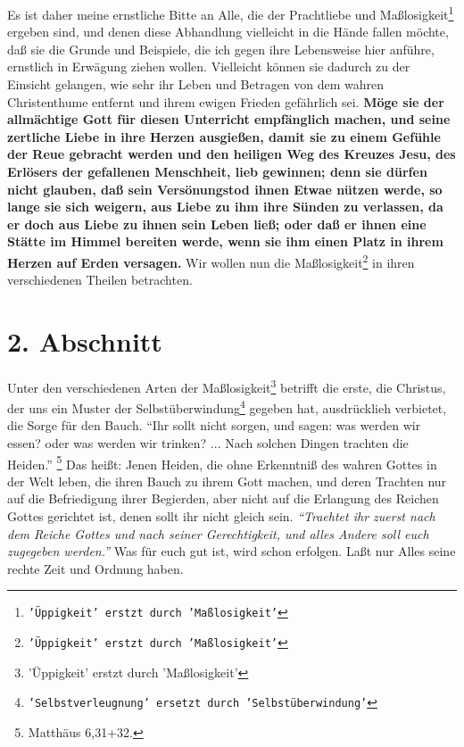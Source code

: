 Es ist daher meine
ernstliche Bitte an Alle, die der Prachtliebe und Maßlosigkeit\footnote{\texttt{'Üppigkeit' erstzt durch 'Maßlosigkeit'}} ergeben sind, und
denen diese Abhandlung vielleicht in die Hände fallen möchte, daß sie die Grunde
und Beispiele, die ich gegen ihre Lebensweise hier anführe, ernstlich in
Erwägung ziehen wollen. Vielleicht können sie dadurch zu der Einsicht gelangen,
wie sehr ihr Leben und Betragen von dem wahren Christenthume entfernt und ihrem
ewigen Frieden gefährlich sei. \textbf{Möge sie der allmächtige Gott für diesen
Unterricht empfänglich machen, und seine zertliche Liebe in ihre Herzen
ausgießen, damit sie zu einem Gefühle der Reue gebracht werden und den heiligen
Weg des Kreuzes Jesu, des Erlösers der gefallenen Menschheit, lieb gewinnen;
denn sie dürfen nicht glauben, daß sein Versönungstod ihnen Etwae nützen werde,
so lange sie sich weigern, aus Liebe zu ihm ihre Sünden zu verlassen, da er doch
aus Liebe zu ihnen sein Leben ließ; oder daß er ihnen eine Stätte im Himmel
bereiten werde, wenn sie ihm einen Platz in ihrem Herzen auf Erden versagen.} Wir
wollen nun die Maßlosigkeit\footnote{\texttt{'Üppigkeit' erstzt durch 'Maßlosigkeit'}} in ihren verschiedenen Theilen betrachten.

\section{2. Abschnitt} \label{kap14_ab2}

Unter den verschiedenen Arten der Maßlosigkeit\footnote{'Üppigkeit' erstzt durch 'Maßlosigkeit'} betrifft die erste, die Christus,
der uns ein Muster der Selbstüberwindung\footnote{\texttt{'Selbstverleugnung' ersetzt durch 'Selbstüberwindung'}} gegeben hat, ausdrücklieh verbietet,
die Sorge für den Bauch.
"`Ihr sollt nicht sorgen, und sagen: was werden wir
essen? oder was werden wir trinken? ... Nach solchen Dingen trachten die
Heiden."'
\footnote{Matthäus 6,31+32.}
Das heißt: Jenen Heiden, die ohne
Erkenntniß des wahren Gottes in der Welt leben, die ihren Bauch zu ihrem Gott
machen, und deren Trachten nur auf die Befriedigung ihrer Begierden, aber nicht
auf die Erlangung des Reichen Gottes gerichtet ist, denen sollt ihr nicht gleich
sein.
\textit{"`Traehtet ihr zuerst nach dem Reiche Gottes und nach seiner
Gerechtigkeit, und alles Andere soll euch zugegeben werden."'} Was für euch gut
ist, wird schon erfolgen. Laßt nur Alles seine rechte Zeit und Ordnung haben.

